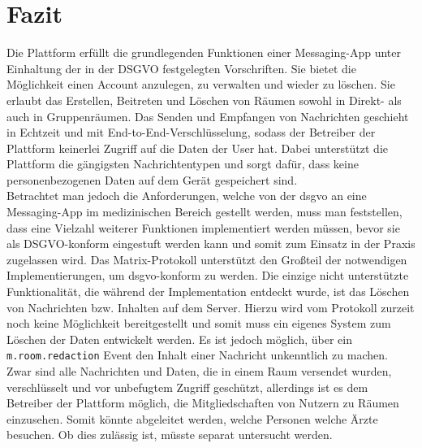     \chapter{Fazit}\label{ch:fazit}
    Die Plattform erfüllt die grundlegenden Funktionen einer Messaging-App unter Einhaltung der in der DSGVO festgelegten Vorschriften.
    Sie bietet die Möglichkeit einen Account anzulegen, zu verwalten und wieder zu löschen.
    Sie erlaubt das Erstellen, Beitreten und Löschen von Räumen sowohl in Direkt- als auch in Gruppenräumen.
    Das Senden und Empfangen von Nachrichten geschieht in Echtzeit und mit End-to-End-Verschlüsselung, sodass der Betreiber der Plattform keinerlei Zugriff auf die Daten der User hat.
    Dabei unterstützt die Plattform die gängigsten Nachrichtentypen und sorgt dafür, dass keine personenbezogenen Daten auf dem Gerät gespeichert sind.\\
    Betrachtet man jedoch die Anforderungen, welche von der \ac{dsgvo} an eine Messaging-App im medizinischen Bereich gestellt werden, muss man feststellen, dass eine Vielzahl weiterer Funktionen implementiert werden müssen, bevor sie als DSGVO-konform eingestuft werden kann und somit zum Einsatz in der Praxis zugelassen wird.
    Das Matrix-Protokoll unterstützt den Großteil der notwendigen Implementierungen, um \ac{dsgvo}-konform zu werden.
    Die einzige nicht unterstützte Funktionalität, die während der Implementation entdeckt wurde, ist das Löschen von Nachrichten bzw. Inhalten auf dem Server.
    Hierzu wird vom Protokoll zurzeit noch keine Möglichkeit bereitgestellt und somit muss ein eigenes System zum Löschen der Daten entwickelt werden.
    Es ist jedoch möglich, über ein \texttt{m.room.redaction} Event den Inhalt einer Nachricht unkenntlich zu machen.\\
    Zwar sind alle Nachrichten und Daten, die in einem Raum versendet wurden, verschlüsselt und vor unbefugtem Zugriff geschützt, allerdings ist es dem Betreiber der Plattform möglich, die Mitgliedschaften von Nutzern zu Räumen einzusehen.
    Somit könnte abgeleitet werden, welche Personen welche Ärzte besuchen.
    Ob dies zulässig ist, müsste separat untersucht werden.


